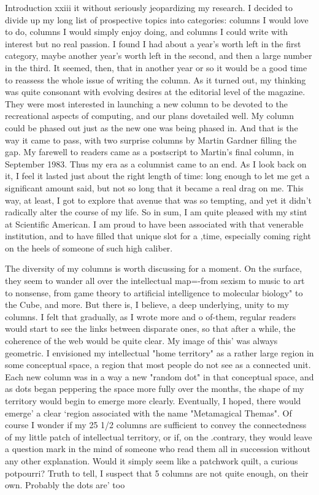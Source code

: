 Introduction                                                                          xxiii it without seriously jeopardizing my research. I decided to divide up my long list of prospective topics into categories: columns I would love to do, columns I would simply enjoy doing, and columns I could write with interest but no real passion. I found I had about a year's worth left in the first category, maybe another year's worth left in the second, and then a large number in the third. It seemed, then, that in another year or so it would be a good time to reassess the whole issue of writing the column. As it turned out, my thinking was quite consonant with evolving desires at the editorial level of the magazine. They were most interested in launching a new column to be devoted to the recreational aspects of computing, and our plans dovetailed well. My column could be phased out just as the new one was being phased in. And that is the way it came to pass, with two surprise columns by Martin Gardner filling the gap. My farewell to readers came as a postscript to Martin's final column, in September 1983. Thus my era as a columnist came to an end. As I look back on it, I feel it lasted just about the right length of time: long enough to let me get a significant amount said, but not so long that it became a real drag on me. This way, at least, I got to explore that avenue that was so tempting, and yet it didn't radically alter the course of my life. So in sum, I am quite pleased with my stint at Scientific American. I am proud to have been associated with that venerable institution, and to have filled that unique slot for a ,time, especially coming right on the heels of someone of such high caliber. 
\separator

The diversity of my columns is worth discussing for a moment. On the surface, they seem to wander all over the intellectual map=-from sexism to music to art to nonsense, from game theory to artificial intelligence to molecular biology" to the Cube, and more. But there is, I believe, a deep underlying, unity to my columns. I felt that gradually, as I wrote more and o of-them, regular readers would start to see the links between disparate ones, so that after a while, the coherence of the web would be quite clear. My image of this' was always geometric. I envisioned my intellectual "home territory" as a rather large region in some conceptual space, a region that most people do not see as a connected unit. Each new column was in a way a new "random dot" in that conceptual space, and as dots began peppering the space more fully over the months, the shape of my territory would begin to emerge more clearly. Eventually, I hoped, there would emerge' a clear `region associated with the name "Metamagical Themas". Of course I wonder if my 25 1/2 columns are sufficient to convey the connectedness of my little patch of intellectual territory, or if, on the .contrary, they would leave a question mark in the mind of someone who read them all in succession without any other explanation. Would it simply seem like a patchwork quilt, a curious potpourri? Truth to tell, I suspect that 5 columns are not quite enough, on their own. Probably the dots are' too 



